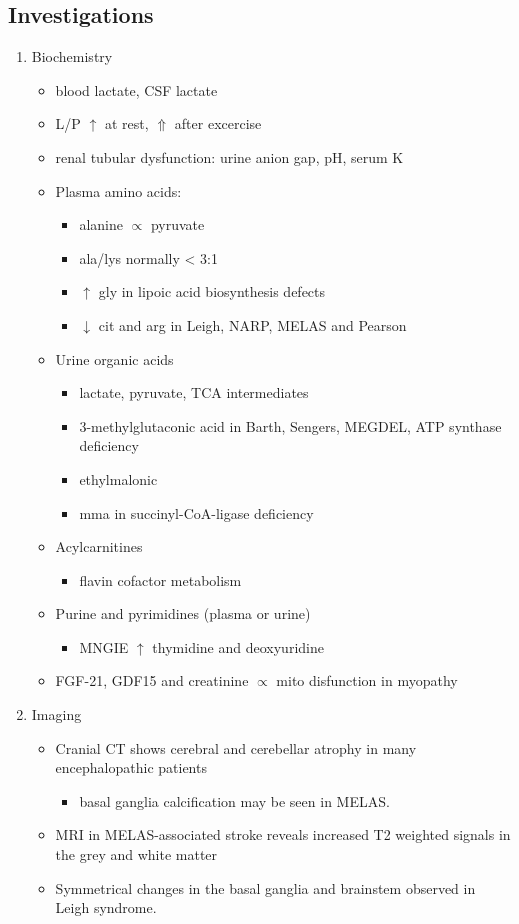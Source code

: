 \documentclass{scrartcl}
\begin{document}
\subsection{Investigations}
\label{sec:orgb4b31ba}

\begin{enumerate}
\item Biochemistry
\label{sec:orgcecd9c1}
\begin{itemize}
\item blood lactate, CSF lactate
\item L/P \(\uparrow\) at rest, \(\Uparrow\) after excercise
\item renal tubular dysfunction: urine anion gap, pH, serum K
\item Plasma amino acids:
\begin{itemize}
\item alanine \(\propto\) pyruvate
\item ala/lys normally \textless{} 3:1
\item \(\uparrow\) gly in lipoic acid biosynthesis defects
\item \(\downarrow\) cit and arg in Leigh, NARP, MELAS and Pearson
\end{itemize}
\item Urine organic acids
\begin{itemize}
\item lactate, pyruvate, TCA intermediates
\item 3-methylglutaconic acid in Barth, Sengers, MEGDEL, ATP synthase deficiency
\item ethylmalonic
\item mma in succinyl-CoA-ligase deficiency
\end{itemize}
\item Acylcarnitines
\begin{itemize}
\item flavin cofactor metabolism
\end{itemize}
\item Purine and pyrimidines (plasma or urine)
\begin{itemize}
\item MNGIE \(\uparrow\) thymidine and deoxyuridine
\end{itemize}
\item FGF-21, GDF15 and creatinine \(\propto\) mito disfunction in myopathy
\end{itemize}

\item Imaging
\label{sec:org072036e}
\begin{itemize}
\item Cranial CT shows cerebral and cerebellar atrophy in many encephalopathic patients
\begin{itemize}
\item basal ganglia calcification may be seen in MELAS.
\end{itemize}
\item MRI in MELAS-associated stroke reveals increased T2 weighted signals in the grey and white matter
\item Symmetrical changes in the basal ganglia and brainstem observed in Leigh syndrome.
\end{itemize}


\end{enumerate}
\end{document}
